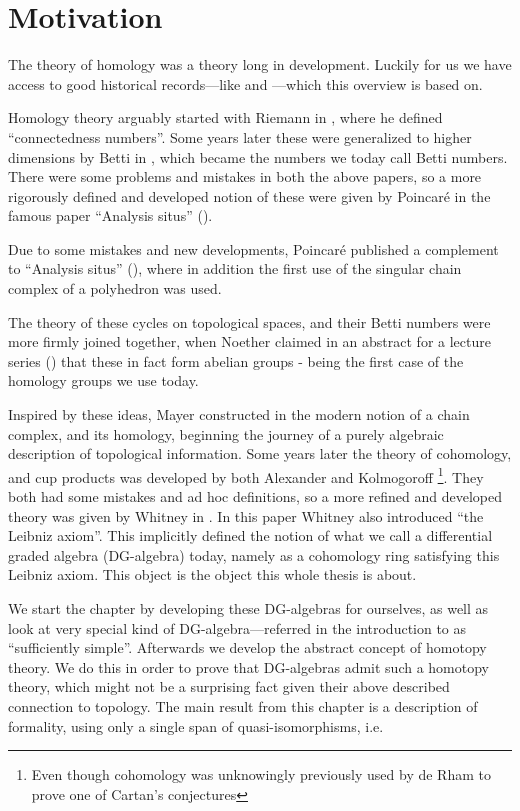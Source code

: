 
\section{Motivation}

The theory of homology was a theory long in development. Luckily for us we have access to good historical records---like \cite{history1} and \cite{history2}---which this overview is based on. 

Homology theory arguably started with Riemann in \cite{riemann}, where he defined ``connectedness numbers''. Some years later these were generalized to higher dimensions by Betti in \cite{betti}, which became the numbers we today call Betti numbers. There were some problems and mistakes in both the above papers, so a more rigorously defined and developed notion of these were given by Poincaré in the famous paper ``Analysis situs'' (\cite{situs}). 

Due to some mistakes and new developments, Poincaré published a complement to ``Analysis situs'' (\cite{situs2}), where in addition the first use of the singular chain complex of a polyhedron was used. 

The theory of these cycles on topological spaces, and their Betti numbers were more firmly joined together, when Noether claimed in an abstract for a lecture series (\cite{noether}) that these in fact form abelian groups - being the first case of the homology groups we use today. 

Inspired by these ideas, Mayer constructed in \cite{mayer, mayer2} the modern notion of a chain complex, and its homology, beginning the journey of a purely algebraic description of topological information. Some years later the theory of cohomology, and cup products was developed by both Alexander and Kolmogoroff \footnote{Even though cohomology was unknowingly previously used by de Rham to prove one of Cartan's conjectures}. They both had some mistakes and ad hoc definitions, so a more refined and developed theory was given by Whitney in \cite{whitney}. In this paper Whitney also introduced ``the Leibniz axiom''. This implicitly defined the notion of what we call a differential graded algebra (DG-algebra) today, namely as a cohomology ring satisfying this Leibniz axiom. This object is the object this whole thesis is about.

We start the chapter by developing these DG-algebras for ourselves, as well as look at very special kind of DG-algebra---referred in the introduction to as ``sufficiently simple''. Afterwards we develop the abstract concept of homotopy theory. We do this in order to prove that DG-algebras admit such a homotopy theory, which might not be a surprising fact given their above described connection to topology. The main result from this chapter is a description of formality, using only a single span of quasi-isomorphisms, i.e. 

